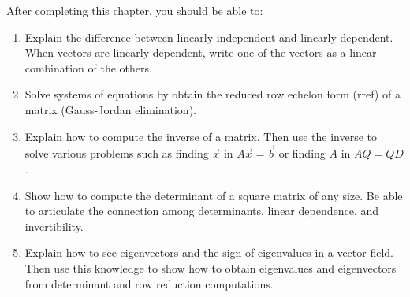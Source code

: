 \newcommand{\urlrref}{http://bmw.byuimath.com/dokuwiki/doku.php?id=rref\_calculator}



After completing this chapter, you should be able to:

\begin{enumerate}
\item Explain the difference between linearly independent and linearly dependent. When vectors are linearly dependent, write one of the vectors as a linear combination of the others. 
\item Solve systems of equations by obtain the reduced row echelon form (rref) of a matrix (Gauss-Jordan elimination).
\item Explain how to compute the inverse of a matrix. Then use the inverse to solve various problems such as finding $\vec x$ in $A\vec x = \vec b$ or finding $A$ in $AQ=QD$. 
\item Show how to compute the determinant of a square matrix of any size. Be able to articulate the connection among determinants, linear dependence, and invertibility. 
\item Explain how to see eigenvectors and the sign of eigenvalues in a vector field. Then use this knowledge to show how to obtain eigenvalues and eigenvectors from determinant and row reduction computations. 
\end{enumerate}


\newcommand{\ideagau}{Solving Systems of Equations}
\newcommand{\ideaind}{Linear Independence and Dependence}
\newcommand{\ideamul}{Matrix Multiplication and Inverses}
\newcommand{\ideadet}{Applications of Determinants}
\newcommand{\ideaeig}{Seeing Eigenvectors in Vector Fields}



\mysubsection{\ideaind}

